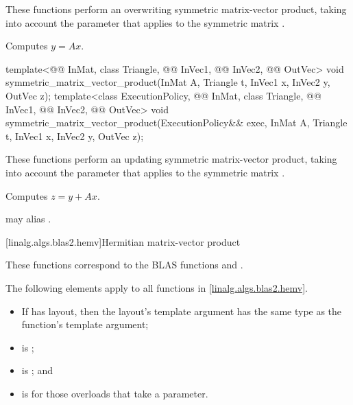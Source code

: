 \begin{itemdescr}

\pnum
These functions perform an overwriting symmetric matrix-vector product,
taking into account the  parameter
that applies to the symmetric matrix .

\pnum
\effects
Computes $y = A x$.
\end{itemdescr}

%
\begin{itemdecl}
template<@@ InMat, class Triangle, @@ InVec1, @@ InVec2, @@ OutVec>
  void symmetric_matrix_vector_product(InMat A, Triangle t, InVec1 x, InVec2 y, OutVec z);
template<class ExecutionPolicy,
         @@ InMat, class Triangle, @@ InVec1, @@ InVec2, @@ OutVec>
  void symmetric_matrix_vector_product(ExecutionPolicy&& exec,
                                       InMat A, Triangle t, InVec1 x, InVec2 y, OutVec z);
\end{itemdecl}

\begin{itemdescr}
\pnum
These functions perform an updating symmetric matrix-vector product,
taking into account the  parameter
that applies to the symmetric matrix .

\pnum
\effects
Computes $z = y + A x$.

\pnum
\remarks
{} may alias .
\end{itemdescr}

[linalg.algs.blas2.hemv]{Hermitian matrix-vector product}

\pnum
\begin{note}
These functions correspond to the BLAS functions
 and \supercite{blas2}.
\end{note}

\pnum
The following elements apply to all functions in \ref{linalg.algs.blas2.hemv}.

\pnum
\mandates
\begin{itemize}
\item
If  has  layout,
then the layout's  template argument
has the same type as the function's  template argument;
\item
{}
is ;
\item
{}
is ; and
\item
{}
is  for those overloads that take a  parameter.
\end{itemize}

